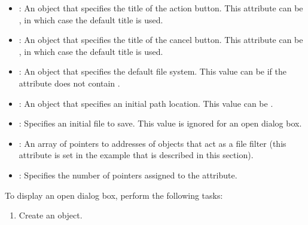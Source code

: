 \documentclass[letterpaper,12pt,english,openany,oneside]{sphinxmanual}
\begin{document}
\begin{itemize}
\item {} 
: An  object that specifies the title of the action button. This attribute can be , in which case the default title is used.

\item {} 
: An  object that specifies the title of the cancel button. This attribute can be , in which case the default title is used.

\item {} 
: An  object that specifies the default file system. This value can be  if the  attribute does not contain .

\item {} 
: An  object that specifies an initial path location. This value can be .

\item {} 
: Specifies an initial file to save. This value is ignored for an open dialog box.

\item {} 
: An array of pointers to addresses of  objects that act as a file filter (this attribute is set in the example that is described in this section).

\item {} 
: Specifies the number of  pointers assigned to the  attribute.

\end{itemize}

To display an open dialog box, perform the following tasks:
\begin{enumerate}
%
\item {} 
Create an  object.

\end{enumerate}
\end{document}
